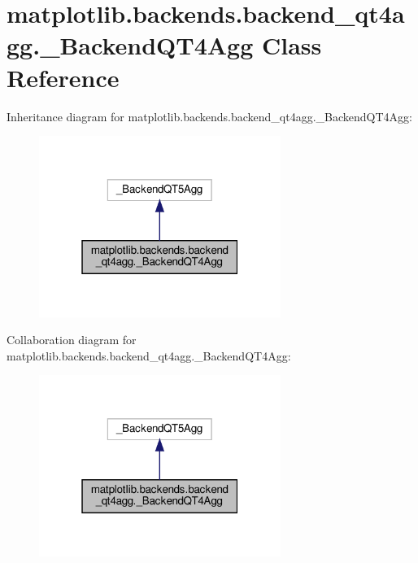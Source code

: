 \hypertarget{classmatplotlib_1_1backends_1_1backend__qt4agg_1_1__BackendQT4Agg}{}\section{matplotlib.\+backends.\+backend\+\_\+qt4agg.\+\_\+\+Backend\+Q\+T4\+Agg Class Reference}
\label{classmatplotlib_1_1backends_1_1backend__qt4agg_1_1__BackendQT4Agg}


Inheritance diagram for matplotlib.\+backends.\+backend\+\_\+qt4agg.\+\_\+\+Backend\+Q\+T4\+Agg\+:
\nopagebreak
\begin{figure}[H]
\begin{center}
\leavevmode
\includegraphics[width=223pt]{classmatplotlib_1_1backends_1_1backend__qt4agg_1_1__BackendQT4Agg__inherit__graph}
\end{center}
\end{figure}


Collaboration diagram for matplotlib.\+backends.\+backend\+\_\+qt4agg.\+\_\+\+Backend\+Q\+T4\+Agg\+:
\nopagebreak
\begin{figure}[H]
\begin{center}
\leavevmode
\includegraphics[width=223pt]{classmatplotlib_1_1backends_1_1backend__qt4agg_1_1__BackendQT4Agg__coll__graph}
\end{center}
\end{figure}
